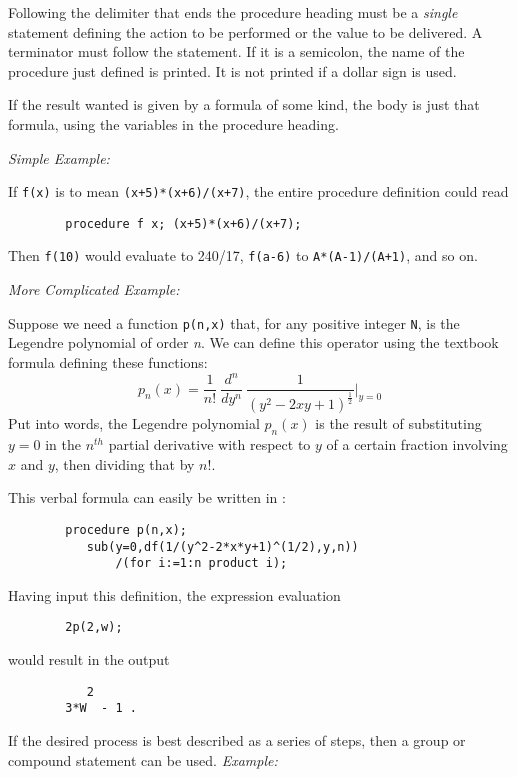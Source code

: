 Following the delimiter that ends the procedure heading must be a {\em
single} statement defining the action to be performed or the value to be
delivered.  A terminator must follow the statement.  If it is a semicolon,
the name of the procedure just defined is printed.  It is not printed if a
dollar sign is used.

If the result wanted is given by a formula of some kind, the body is just
that formula, using the variables in the procedure heading.

{\it Simple Example:}

If {\tt f(x)} is to mean {\tt (x+5)*(x+6)/(x+7)}, the entire procedure
definition could read
\begin{verbatim}
        procedure f x; (x+5)*(x+6)/(x+7);
\end{verbatim}
Then {\tt f(10)} would evaluate to 240/17, {\tt f(a-6)} to
{\tt A*(A-1)/(A+1)}, and so on.

{\it More Complicated Example:}

Suppose we need a function {\tt p(n,x)} that, for any positive integer
{\tt N}, is the Legendre polynomial of order
{\em n}. We can define this operator using the
textbook formula defining these functions:
\begin{displaymath}
p_n(x) = \frac{1}{n!}\  
\frac{d^n}{dy^n}\ \frac{1}{(y^2 - 2xy + 1)
^{\frac{1}{2}}}\Bigg\vert_{y=0}
\end{displaymath}
Put into words, the Legendre polynomial $p_n(x)$ is the result of
substituting $y=0$ in the $n^{th}$ partial derivative with respect to $y$
of a certain fraction involving $x$ and $y$, then dividing that by $n!$.

This verbal formula can easily be written in {\REDUCE}:
\begin{verbatim}
        procedure p(n,x);
           sub(y=0,df(1/(y^2-2*x*y+1)^(1/2),y,n))
               /(for i:=1:n product i);
\end{verbatim}
Having input this definition, the expression evaluation
\begin{verbatim}
        2p(2,w);
\end{verbatim}
would result in the output
\begin{verbatim}
           2
        3*W  - 1 .
\end{verbatim}
If the desired process is best described as a series of steps, then a group
or compound statement can be used.
\extendedmanual{\newpage}
{\it Example:}


